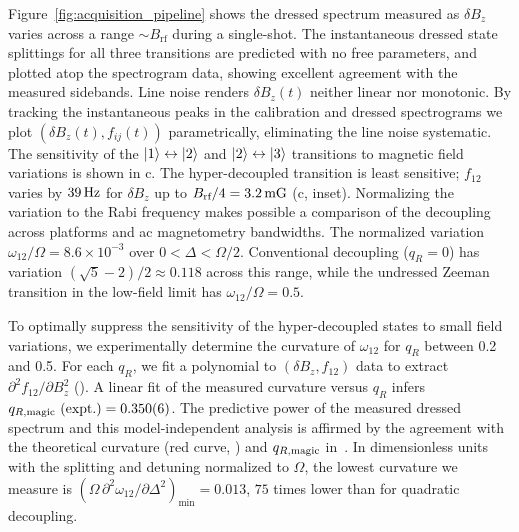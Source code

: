 \documentclass[aps,prl,reprint,superscriptaddress,floatfix]{revtex4-1}
\begin{document}
Figure~\ref{fig:acquisition_pipeline} shows the dressed spectrum measured as $\delta B_z$ varies across a range $\sim B_{\text{rf}}$ during a single-shot.
The instantaneous dressed state splittings for all three transitions are predicted with no free parameters, and plotted atop the spectrogram data, showing excellent agreement with the measured sidebands.
Line noise renders $\delta B_z(t)$ neither linear nor monotonic.
By tracking the instantaneous peaks in the calibration and dressed spectrograms we plot $(\delta B_z(t), f_{ij}(t))$ parametrically, eliminating the line noise systematic.
The sensitivity of the $\vert 1 \rangle  \leftrightarrow \vert 2 \rangle $ and $\vert 2 \rangle  \leftrightarrow \vert 3 \rangle $ transitions to magnetic field variations is shown in c.
The hyper-decoupled transition is least sensitive; $f_{12}$ varies by $\unit[39]{Hz}$ for $\delta B_z$ up to $B_{\text{rf}}/4 = \unit[3.2]{mG}$ (c, inset).
Normalizing the variation to the Rabi frequency makes possible a comparison of the decoupling across platforms and ac magnetometry bandwidths. 
The normalized variation $\omega_{12}/\Omega = 8.6\times10^{-3}$ over $0<\Delta<\Omega/2$.
Conventional decoupling ($q_R=0$) has variation $(\sqrt{5}-2)/2 \approx 0.118$ across this range, while the undressed Zeeman transition in the low-field limit has $\omega_{12}/\Omega=0.5$.

To optimally suppress the sensitivity of the hyper-decoupled states to small field variations, we experimentally determine the curvature of $\omega_{12}$  for $q_R$ between 0.2 and 0.5.
For each $q_R$, we fit a polynomial to $(\delta B_z, f_{12})$ data to extract $\partial^2 f_{12}/\partial B_z^2$ ().
A linear fit of the measured curvature versus $q_R$ infers $q_{R,\text{magic}}\text{ (expt.)} = 0.350(6)$.
The predictive power of the measured dressed spectrum and this model-independent analysis is affirmed by the agreement with the theoretical curvature (red curve, ) and $q_{R,\text{magic}}$ in~.
In dimensionless units with the splitting and detuning normalized to $\Omega$, the lowest curvature we measure is $\left(\Omega\, \partial^2\omega_{12}/\partial \Delta^2\right)_{\text{min}} = 0.013$, $75$ times lower than for quadratic decoupling.
\end{document}
